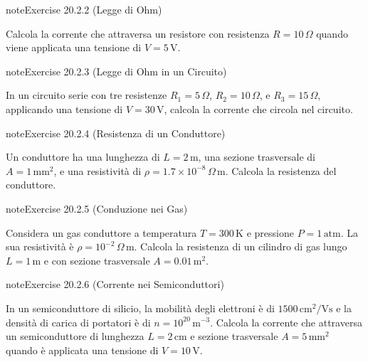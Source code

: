 \documentclass[letterpaper,10pt,italian]{jupyterBook}
\begin{document}
\begin{sphinxadmonition}{note}{Exercise 20.2.2 (Legge di Ohm)}



\sphinxAtStartPar
Calcola la corrente che attraversa un resistore con resistenza \(R = 10 \, \Omega\) quando viene applicata una tensione di \(V = 5 \, \text{V}\).
\end{sphinxadmonition}
 \label{exercise:ch/electromagnetism/electric-current-problems-exercise-2}

\begin{sphinxadmonition}{note}{Exercise 20.2.3 (Legge di Ohm in un Circuito)}



\sphinxAtStartPar
In un circuito serie con tre resistenze \(R_1 = 5 \, \Omega\), \(R_2 = 10 \, \Omega\), e \(R_3 = 15 \, \Omega\), applicando una tensione di \(V = 30 \, \text{V}\), calcola la corrente che circola nel circuito.
\end{sphinxadmonition}
 \label{exercise:ch/electromagnetism/electric-current-problems-exercise-3}

\begin{sphinxadmonition}{note}{Exercise 20.2.4 (Resistenza di un Conduttore)}



\sphinxAtStartPar
Un conduttore ha una lunghezza di \(L = 2 \, \text{m}\), una sezione trasversale di \(A = 1 \, \text{mm}^2\), e una resistività di \(\rho = 1.7 \times 10^{-8} \, \Omega \, \text{m}\). Calcola la resistenza del conduttore.
\end{sphinxadmonition}
 \label{exercise:ch/electromagnetism/electric-current-problems-exercise-4}

\begin{sphinxadmonition}{note}{Exercise 20.2.5 (Conduzione nei Gas)}



\sphinxAtStartPar
Considera un gas conduttore a temperatura \(T = 300 \, \text{K}\) e pressione \(P = 1 \, \text{atm}\). La sua resistività è \(\rho = 10^{-2} \, \Omega \, \text{m}\). Calcola la resistenza di un cilindro di gas lungo \(L = 1 \, \text{m}\) e con sezione trasversale \(A = 0.01 \, \text{m}^2\).
\end{sphinxadmonition}
 \label{exercise:ch/electromagnetism/electric-current-problems-exercise-5}

\begin{sphinxadmonition}{note}{Exercise 20.2.6 (Corrente nei Semiconduttori)}



\sphinxAtStartPar
In un semiconduttore di silicio, la mobilità degli elettroni è di \(1500 \, \text{cm}^2/\text{V}\text{s}\) e la densità di carica di portatori è di \(n = 10^{20} \, \text{m}^{-3}\). Calcola la corrente che attraversa un semiconduttore di lunghezza \(L = 2 \, \text{cm}\) e sezione trasversale \(A = 5 \, \text{mm}^2\) quando è applicata una tensione di \(V = 10 \, \text{V}\).
\end{sphinxadmonition}
 \label{exercise:ch/electromagnetism/electric-current-problems-exercise-6}
\end{document}
